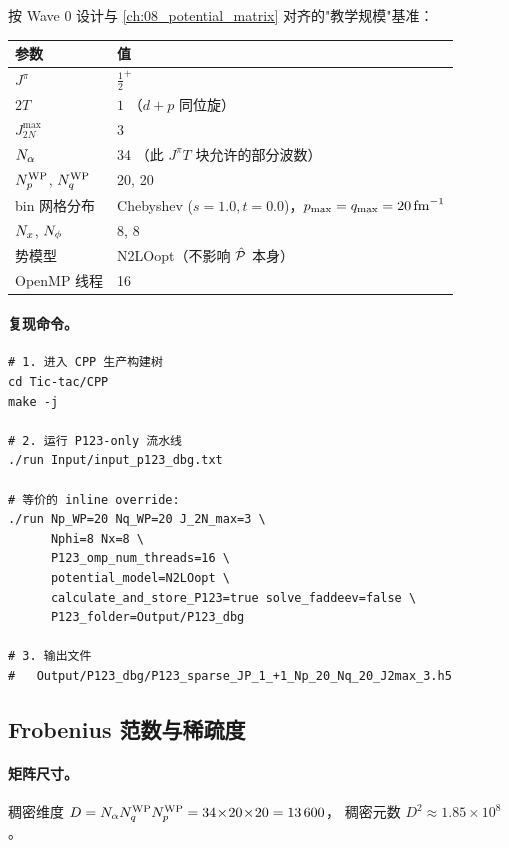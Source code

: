 按 Wave 0 设计与 \cref{ch:08_potential_matrix} 对齐的"教学规模"基准：

\begin{center}
\renewcommand{\arraystretch}{1.18}
\begin{tabular}{ll}
\toprule
参数 & 值 \\
\midrule
\(J^\pi\) & \(\tfrac{1}{2}^{+}\) \\
\(2T\) & \(1\) （\(d+p\) 同位旋） \\
\(J_{2N}^{\max}\) & 3 \\
\(N_\alpha\) & 34 （此 \(J^\pi T\) 块允许的部分波数） \\
\({N_{p}^{\text{WP}}}\), \({N_{q}^{\text{WP}}}\) & 20, 20 \\
bin 网格分布 & Chebyshev (\(s=1.0, t=0.0\))，\(p_{\max}=q_{\max}=\SI{20}{\text{fm}^{-1}}\) \\
\(N_{x}\), \(N_{\phi}\) & 8, 8 \\
势模型 & N2LOopt（不影响 \(\hat{\mathcal{P}}\) 本身） \\
OpenMP 线程 & 16 \\
\bottomrule
\end{tabular}
\end{center}

\paragraph{复现命令。}
\begin{lstlisting}[style=config, caption={数字闭环复现命令},
                   label={lst:ch09-repro-cmd}]
# 1. 进入 CPP 生产构建树
cd Tic-tac/CPP
make -j

# 2. 运行 P123-only 流水线
./run Input/input_p123_dbg.txt

# 等价的 inline override:
./run Np_WP=20 Nq_WP=20 J_2N_max=3 \
      Nphi=8 Nx=8 \
      P123_omp_num_threads=16 \
      potential_model=N2LOopt \
      calculate_and_store_P123=true solve_faddeev=false \
      P123_folder=Output/P123_dbg

# 3. 输出文件
#   Output/P123_dbg/P123_sparse_JP_1_+1_Np_20_Nq_20_J2max_3.h5
\end{lstlisting}

\subsection{Frobenius 范数与稀疏度}
\label{subsec:ch09-frob-sparsity}

\paragraph{矩阵尺寸。}
稠密维度 \(D = N_\alpha{N_{q}^{\text{WP}}}{N_{p}^{\text{WP}}} = 34\!\times\!20\!\times\!20 = 13\,600\)，
稠密元数 \(D^2 \approx 1.85\times 10^{8}\)。

